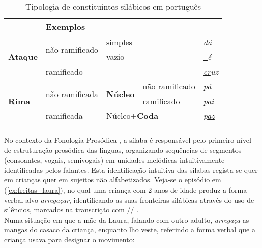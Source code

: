 \documentclass[output=paper]{LSP/langsci}
\begin{document}
\begin{table}
\begin{tabular}{lllll}
\lsptoprule
\multicolumn{4}{l}{Constituintes Silábicos}                                                          & Exemplos \\
\midrule
\multirow{3}{*}{\textbf{Ataque}} & \multirow{2}{*}{não ramificado} & \multicolumn{2}{l}{simples}              & \textit{\underline{d}á}       \\
                        &                                 & \multicolumn{2}{l}{vazio}                & \textit{\underline{~}é}       \\
                        & \multicolumn{3}{l}{ramificado}                                             & \textit{\underline{cr}uz}     \\
\multirow{3}{*}{\textbf{Rima}}   & \multirow{2}{*}{não ramificada} & \multirow{2}{*}{\textbf{Núcleo}} & não ramificado & \textit{p\underline{á}}       \\
                        &                                 &                         & ramificado     & \textit{p\underline{ai}}      \\
                        & ramificada                      & \multicolumn{2}{l}{Núcleo$+$\textbf{Coda}}          & \textit{p\underline{az}}     \\
\lspbottomrule
  \end{tabular}
  \caption{Tipologia de constituintes silábicos em português}
  \label{tab:freitas_tipologia}
\end{table}

No contexto da Fonologia Prosódica \citep{nesporvogel1986}, a sílaba é responsável pelo primeiro nível de estruturação prosódica das línguas, organizando sequências de segmentos (consoantes, vogais, semivogais) em unidades melódicas intuitivamente identificadas pelos falantes. Esta identificação intuitiva das sílabas regista-se quer em crianças quer em sujeitos não alfabetizados. Veja-se o episódio em (\ref{ex:freitas_laura}), no qual uma criança com 2 anos de idade produz a forma verbal alvo \textit{arregaçar}, identificando as suas fronteiras silábicas através do uso de silêncios, marcados na transcrição com // \citep{freitas1997,freitas_etal2007}.\\

Numa situação em que a mãe da Laura, falando com outro adulto, \textit{arregaça} as mangas do casaco da criança, enquanto lho veste, referindo a forma verbal que a criança usava para designar o movimento:
\end{document}
